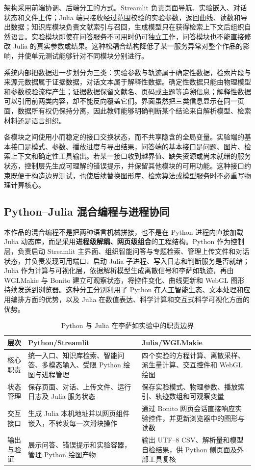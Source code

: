\documentclass[UTF8,a4paper,zihao=-4]{ctexart}
\begin{document}
架构采用前端协调、后端分工的方式。Streamlit 负责页面导航、实验嵌入、对话状态和文件上传；Julia 端只接收经过范围校验的实验参数，返回曲线、读数和导出数据；知识库模块负责文献索引与召回，生成模型只在获得检索上下文后组织自然语言。实验模块即使在问答服务不可用时仍可独立工作，问答模块也不能直接修改 Julia 的真实参数或结果。这种松耦合结构降低了某一服务异常对整个作品的影响，并使单元测试能够针对不同模块分别进行。

系统内部把数据进一步划分为三类：实验参数与轨迹属于确定性数据，检索片段与来源元数据属于证据数据，对话文本属于解释性数据。确定性数据只能由物理模型和参数校验流程产生；证据数据保留文献名、页码或主题等追溯信息；解释性数据可以引用前两类内容，却不能反向覆盖它们。界面虽然把三类信息显示在同一页面，数据所有权仍保持分离，因此教师能够明确判断某个结论来自解析模型、检索材料还是语言组织。

各模块之间使用小而稳定的接口交换状态，而不共享隐含的全局变量。实验端的基本接口是模式、参数、播放进度与导出结果，问答端的基本接口是问题、图片、检索上下文和确定性工具输出。若某一接口收到越界值、缺失资源或尚未就绪的服务状态，控制层先生成可理解的错误提示，并保留其他模块的可用功能。这种接口约束既便于构造边界测试，也使后续替换图形库、检索算法或模型服务时不必重写物理计算核心。

\subsection{Python--Julia 混合编程与进程协同}
本作品的混合编程不是把两种语言机械拼接，也不是在 Python 进程内直接加载 Julia 动态库，而是采用\textbf{进程级解耦、网页级组合}的工程结构。Python 作为控制层，负责启动 Streamlit 主界面、组织智能问答与专题检索、管理上传文件和对话状态，并负责发现可用端口、启动 Julia 子进程、写入日志和判断服务是否就绪；Julia 作为计算与可视化层，依据解析模型生成离散信号和李萨如轨迹，再由 WGLMakie 与 Bonito 建立可观察状态，将控件变化、曲线更新和 WebGL 图形持续发送到浏览器\cite{software}。这种分工分别利用了 Python 在人工智能生态、文本处理和应用编排方面的优势，以及 Julia 在数值表达、科学计算和交互式科学可视化方面的优势。

\begin{table}[!htb]
\centering
\caption{Python 与 Julia 在李萨如实验中的职责边界}
\begin{tabularx}{\textwidth}{p{2.5cm}XX}
\toprule
层次 & Python/Streamlit & Julia/WGLMakie\\
\midrule
核心职责 & 统一入口、知识库检索、智能问答、多模态输入、受限 Python 绘图与进程管理 & 四个实验的方程计算、离散采样、派生量计算、交互控件和 WebGL 绘图\\
状态管理 & 保存页面、对话、上传文件、运行日志及 Julia 服务状态 & 保存实验模式、物理参数、播放索引、轨迹数组和可观察变量\\
交互接口 & 生成 Julia 本机地址并以网页组件嵌入，不转发每一次滑块操作 & 通过 Bonito 网页会话直接响应实验控件，并更新浏览器中的图形与读数\\
输出与验证 & 展示问答、错误提示和实验容器，管理 Python 绘图产物 & 输出 UTF--8 CSV、解析量和模型自检结果，供 Python 侧页面及外部工具复核\\
\bottomrule
\end{tabularx}
\end{table}
\end{document}
